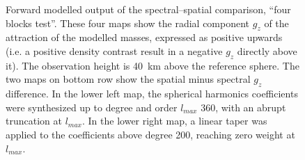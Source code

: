 \begin{subappendices}
\begin{figure} %
    \begin{adjustbox}{center}
    \end{adjustbox}
    \caption[Forward modelled output of the spectral--spatial comparison, ``four blocks test''.]{
        Forward modelled output of the spectral--spatial comparison, ``four blocks test''.
        These four maps show the radial component $g_z$ of the attraction of the modelled masses, expressed as positive upwards (i.e. a positive density contrast result in a negative $g_z$ directly above it).
        The observation height is \SI{40}{km} above the reference sphere.
        The two maps on bottom row show the spatial minus spectral $g_z$ difference.
        In the lower left map, the spherical harmonics coefficients were synthesized up to degree and order $l_{max}$ \num{360}, with an abrupt truncation at $l_{max}$.
        In the lower right map, a linear taper was applied to the coefficients above degree \num{200}, reaching zero weight at $l_{max}$.
    }
    \label{fig:SpatSpecComp:4B_g_maps}
\end{figure}


\end{subappendices}
